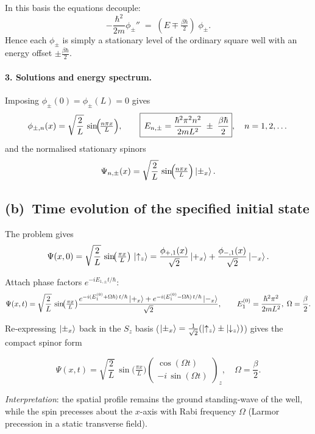 \documentclass[12pt]{article}
\begin{document}
In this basis the equations decouple:
\[
  -\frac{\hbar^{2}}{2m}\phi_{\pm}'' \;=\; (E\mp\tfrac{\beta\hbar}{2})\;\phi_{\pm}.
\]
Hence each \(\phi_{\pm}\) is simply a stationary level of the ordinary
square well with an energy offset \(\pm\tfrac{\beta\hbar}{2}\).

\paragraph{3.  Solutions and energy spectrum.}
Imposing \(\phi_{\pm}(0)=\phi_{\pm}(L)=0\) gives
\[
  \phi_{\pm,n}(x)=\sqrt{\frac{2}{L}}\,\sin\!\Bigl(\!\tfrac{n\pi x}{L}\Bigr),
  \qquad
  \boxed{\,E_{n,\pm}
   =\frac{\hbar^{2}\pi^{2}n^{2}}{2mL^{2}}
     \;\pm\;\frac{\beta\hbar}{2}},\quad n=1,2,\dots
\]
and the normalised stationary spinors
\[
  \Psi_{n,\pm}(x)=
    \sqrt{\frac{2}{L}}\,\sin\!\Bigl(\!\tfrac{n\pi x}{L}\Bigr)\ket{\pm_x}.
\]

\subsection*{(b) Time evolution of the specified initial state}

The problem gives
\[
  \Psi(x,0)=
    \sqrt{\frac{2}{L}}\,
    \sin\!\bigl(\tfrac{\pi x}{L}\bigr)\,
    \ket{\uparrow_z}
  =\frac{\phi_{+,1}(x)}{\sqrt2}\ket{+_x}
  +\frac{\phi_{-,1}(x)}{\sqrt2}\ket{-_x}.
\]

Attach phase factors \(e^{-iE_{1,\pm}t/\hbar}\):
\[
  \Psi(x,t)=
    \sqrt{\frac{2}{L}}\,
    \sin\!\bigl(\tfrac{\pi x}{L}\bigr)
    \frac{
      e^{-i(E_1^{(0)}+\Omega\hbar)\,t/\hbar}\ket{+_x}
      +e^{-i(E_1^{(0)}-\Omega\hbar)\,t/\hbar}\ket{-_x}
    }{\sqrt2},
  \qquad
  E_1^{(0)}=\frac{\hbar^{2}\pi^{2}}{2mL^{2}},\;
  \Omega=\frac{\beta}{2}.
\]

Re‑expressing \(\ket{\pm_x}\) back in the \(S_z\) basis
(\(\ket{\pm_x}=\tfrac{1}{\sqrt2}(\ket{\uparrow_z}\pm\ket{\downarrow_z})\))
gives the compact spinor form

\[
  \boxed{
    \Psi(x,t)=
      \sqrt{\frac{2}{L}}\,
      \sin\!\bigl(\tfrac{\pi x}{L}\bigr)
      \begin{pmatrix}
         \cos(\Omega t) \\
        -i\,\sin(\Omega t)
      \end{pmatrix}_{\!z}
    },
    \quad
    \Omega=\frac{\beta}{2}.
\]

\emph{Interpretation}: the spatial profile remains the ground standing‑wave
of the well, while the spin precesses about the \(x\)-axis with Rabi
frequency \(\Omega\) (Larmor precession in a static transverse field).
\end{document}
